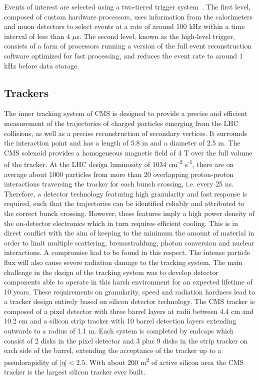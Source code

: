 Events of interest are selected using a two-tiered trigger system~\cite{Khachatryan:2016bia}.
The first level, composed of custom hardware processors, uses information from the calorimeters and muon detectors to select events at a rate of around 100 kHz within a time interval of less than 4 $\mu$s.
The second level, known as the high-level trigger, consists of a farm of processors running a version of the full event reconstruction software optimized for fast processing, and reduces the event rate to around 1 kHz before data storage.
\subsection{Trackers}

The inner tracking system of CMS is designed to provide a precise and efficient measurement
of the trajectories of charged particles emerging from the LHC collisions, as well as a precise
reconstruction of secondary vertices. It surrounds the interaction point and has a length of 5.8 m
and a diameter of 2.5 m. The CMS solenoid provides a homogeneous magnetic field of 4 T over
the full volume of the tracker.
At the LHC design luminosity of 1034 cm\textsuperscript{-2} s\textsuperscript{-1},
there are on average about 1000 particles from more than 20 overlapping proton-proton interactions traversing
the tracker for each bunch crossing, i.e. every 25 ns. Therefore, a detector technology featuring high
granularity and fast response is required, such that the trajectories can be identified reliably and
attributed to the correct bunch crossing. However, these features imply a high power density of
the on-detector electronics which in turn requires efficient cooling. This is in direct conflict with
the aim of keeping to the minimum the amount of material in order to limit multiple scattering,
bremsstrahlung, photon conversion and nuclear interactions. A compromise had to be found in this
respect. The intense particle flux will also cause severe radiation damage to the tracking system.
The main challenge in the design of the tracking system was to develop detector components able
to operate in this harsh environment for an expected lifetime of 10 years. These requirements on
granularity, speed and radiation hardness lead to a tracker design entirely based on silicon detector
technology. The CMS tracker is composed of a pixel detector with three barrel layers at radii
between 4.4 cm and 10.2 cm and a silicon strip tracker with 10 barrel detection layers extending
outwards to a radius of 1.1 m. Each system is completed by endcaps which consist of 2 disks in
the pixel detector and 3 plus 9 disks in the strip tracker on each side of the barrel, extending the
acceptance of the tracker up to a pseudorapidity of $|\eta| < 2.5$. With about 200 m\textsuperscript{2} of active silicon
area the CMS tracker is the largest silicon tracker ever built.

